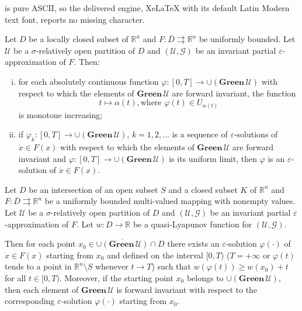 \documentclass[10pt,a4paper]{amsart}
\begin{document}
is pure ASCII, so the delivered engine, XeLaTeX with its default Latin Modern text font, reports no missing character.
\begin{prop}\label{ulimit-sol}
    Let $D$ be a locally closed subset of $\mathbb{R}^n$ and $F: \overline{D} \rightrightarrows \mathbb{R}^n$ be uniformly bounded. Let $\mathcal{U}$ be a $\sigma$-relatively open partition of $D$ and $(\mathcal{U},\mathcal{G})$ be an invariant partial $\varepsilon$-approximation of $F$. Then:
    \begin{enumerate}[(i)]
        \item for each absolutely continuous function $\varphi: [0,T] \to \cup\left(\mathbf{Green}\,\mathcal{U}\right)$ with respect to which the elements of $\mathbf{Green}\,\mathcal{U}$ are forward invariant, the function $$t \mapsto \alpha(t), \text{where } \varphi(t) \in U_{\alpha(t)}$$ is monotone increasing;
        \item if $\varphi_k : [0,T] \to \cup\left(\mathbf{Green}\,\mathcal{U}\right)$, $k=1,2,\dots$ is a sequence of $\varepsilon$-solutions of $\dot{x} \in F(x)$ with respect to which the elements of $\mathbf{Green}\,\mathcal{U}$ are forward invariant and $\varphi : [0,T] \to \cup\left(\mathbf{Green}\,\mathcal{U}\right)$ is its uniform limit, then $\varphi$ is an $\varepsilon$-solution of $\dot{x} \in F(x)$.
    \end{enumerate}
\end{prop}

\begin{prop}\label{esolution}
    Let $D$ be an intersection of an open subset $S$ and a closed subset $K$ of $\mathbb{R}^n$ and $F : \overline{D} \rightrightarrows \mathbb{R}^n$ be a uniformly bounded multi-valued mapping with nonempty values.
    Let $\mathcal{U}$ be a $\sigma$-relatively open partition of $D$ and $(\mathcal{U},\mathcal{G})$ be an invariant partial $\varepsilon$-approximation of $F$. Let $w: D \to \mathbb{R}$ be a quasi-Lyapunov function for $(\mathcal{U},\mathcal{G})$.

    Then for each point $x_0 \in \overline{\cup(\mathbf{Green} \,\mathcal{U})} \cap D$ there exists an $\varepsilon$-solution $\varphi(\cdot)$ of $\dot{x} \in F(x)$ starting from $x_0$ and defined on the interval $[0,T)$ ($T=+\infty$ or $\varphi(t)$ tends to a point in $\mathbb{R}^n \setminus S$ whenever $t \to T$) such that $w(\varphi(t)) \ge w(x_0) + t$ for all $t \in [0,T)$. Moreover, if the starting point $x_0$ belongs to $\cup(\mathbf{Green} \,\mathcal{U})$, then each element of $\mathbf{Green} \,\mathcal{U}$ is forward invariant with respect to the corresponding $\varepsilon$-solution $\varphi(\cdot)$ starting from $x_0$.
\end{prop}
\end{document}
